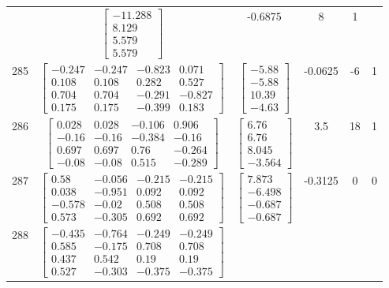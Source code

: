 \documentclass[a4paper,12pt]{article}
\begin{document}
\begin{tabular}{c c c c c c}
&
$\begin{bmatrix} -11.288 \\ 8.129 \\ 5.579 \\ 5.579 \end{bmatrix}$
&
-0.6875
&
8
&
1
\\
285
&
$\begin{bmatrix} -0.247 & -0.247 & -0.823 & 0.071 \\ 0.108 & 0.108 & 0.282 & 0.527 \\ 0.704 & 0.704 & -0.291 & -0.827 \\ 0.175 & 0.175 & -0.399 & 0.183 \end{bmatrix}$
&
$\begin{bmatrix} -5.88 \\ -5.88 \\ 10.39 \\ -4.63 \end{bmatrix}$
&
-0.0625
&
-6
&
1
\\
286
&
$\begin{bmatrix} 0.028 & 0.028 & -0.106 & 0.906 \\ -0.16 & -0.16 & -0.384 & -0.16 \\ 0.697 & 0.697 & 0.76 & -0.264 \\ -0.08 & -0.08 & 0.515 & -0.289 \end{bmatrix}$
&
$\begin{bmatrix} 6.76 \\ 6.76 \\ 8.045 \\ -3.564 \end{bmatrix}$
&
3.5
&
18
&
1
\\
287
&
$\begin{bmatrix} 0.58 & -0.056 & -0.215 & -0.215 \\ 0.038 & -0.951 & 0.092 & 0.092 \\ -0.578 & -0.02 & 0.508 & 0.508 \\ 0.573 & -0.305 & 0.692 & 0.692 \end{bmatrix}$
&
$\begin{bmatrix} 7.873 \\ -6.498 \\ -0.687 \\ -0.687 \end{bmatrix}$
&
-0.3125
&
0
&
0
\\
288
&
$\begin{bmatrix} -0.435 & -0.764 & -0.249 & -0.249 \\ 0.585 & -0.175 & 0.708 & 0.708 \\ 0.437 & 0.542 & 0.19 & 0.19 \\ 0.527 & -0.303 & -0.375 & -0.375 \end{bmatrix}$

\end{tabular}
\end{document}
